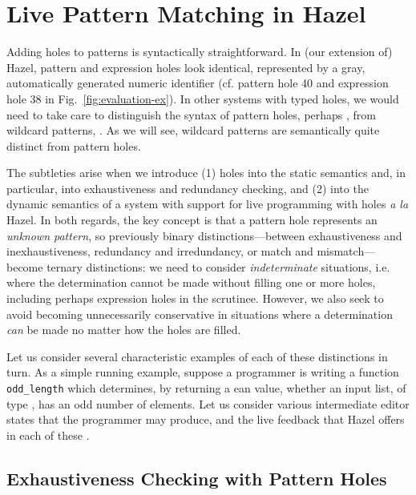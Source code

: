 \section{Live Pattern Matching in Hazel}\label{sec:examples}
Adding holes to patterns is syntactically straightforward. In (our extension of) Hazel, pattern and expression holes look identical, represented by a gray, automatically generated numeric identifier (cf. pattern hole 40 and expression hole 38 in Fig.~\ref{fig:evaluation-ex}). In other systems with typed holes, we would need to take care to distinguish the syntax of pattern holes, perhaps , from wildcard patterns, \li{_}. As we will see, wildcard patterns are semantically quite distinct from pattern holes.

The subtleties arise when we introduce  (1) holes into the static semantics and, in particular, into exhaustiveness and redundancy checking, and (2) into the dynamic semantics of a system with support for live programming with holes \emph{a la} Hazel. In both regards, the key concept is that a pattern hole represents an \emph{unknown  pattern}, so previously binary distinctions---between exhaustiveness and inexhaustiveness, redundancy and irredundancy, or match and mismatch---become ternary distinctions: we need to consider \emph{indeterminate} situations, i.e. where the determination cannot be made without filling one or more holes, including perhaps expression holes in the scrutinee. However, we also seek to avoid becoming unnecessarily conservative in situations where a determination \emph{can} be made no matter how the holes are filled.

Let us consider several characteristic examples of each of these distinctions in turn. As a simple running example, suppose a programmer is writing a function \texttt{odd\_length} which determines, by returning a ean value, whether an input list, of type \li{[Int]}, has an odd number of elements. Let us consider
various intermediate editor states that the programmer may produce, and the live feedback that Hazel offers in each of these \cite{Potter2020HazelTG}.

\subsection{Exhaustiveness Checking with Pattern Holes}
\label{sec:hazel-exhaustiveness}


